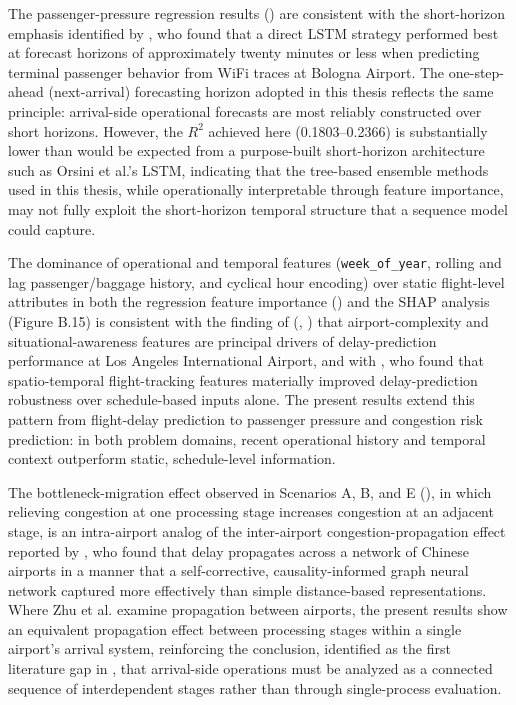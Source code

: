 The passenger-pressure regression results () are consistent with the short-horizon emphasis identified by \textcite{orsini2019neural}, who found that a direct LSTM strategy performed best at forecast horizons of approximately twenty minutes or less when predicting terminal passenger behavior from WiFi traces at Bologna Airport. The one-step-ahead (next-arrival) forecasting horizon adopted in this thesis reflects the same principle: arrival-side operational forecasts are most reliably constructed over short horizons. However, the $R^2$ achieved here (0.1803--0.2366) is substantially lower than would be expected from a purpose-built short-horizon architecture such as Orsini et al.’s LSTM, indicating that the tree-based ensemble methods used in this thesis, while operationally interpretable through feature importance, may not fully exploit the short-horizon temporal structure that a sequence model could capture.

The dominance of operational and temporal features (\nolinkurl{week_of_year}, rolling and lag passenger/baggage history, and cyclical hour encoding) over static flight-level attributes in both the regression feature importance () and the SHAP analysis (Figure B.15) is consistent with the finding of \citeauthor{shao2019flight} (\citeyear{shao2019flight}, \citeyear{shao2022predicting}) that airport-complexity and situational-awareness features are principal drivers of delay-prediction performance at Los Angeles International Airport, and with \textcite{zhang2021spatiotemporal}, who found that spatio-temporal flight-tracking features materially improved delay-prediction robustness over schedule-based inputs alone. The present results extend this pattern from flight-delay prediction to passenger pressure and congestion risk prediction: in both problem domains, recent operational history and temporal context outperform static, schedule-level information.

The bottleneck-migration effect observed in Scenarios A, B, and E (), in which relieving congestion at one processing stage increases congestion at an adjacent stage, is an intra-airport analog of the inter-airport congestion-propagation effect reported by \textcite{zhu2024spatiotemporal}, who found that delay propagates across a network of Chinese airports in a manner that a self-corrective, causality-informed graph neural network captured more effectively than simple distance-based representations. Where Zhu et al. examine propagation between airports, the present results show an equivalent propagation effect between processing stages within a single airport’s arrival system, reinforcing the conclusion, identified as the first literature gap in , that arrival-side operations must be analyzed as a connected sequence of interdependent stages rather than through single-process evaluation.

